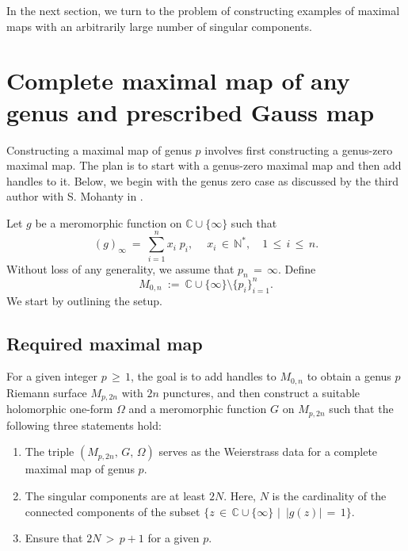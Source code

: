 \documentclass[12pt]{amsart}
\numberwithin{equation}{section}
\begin{document}
In the next section, we turn to the problem of constructing examples of maximal maps with an arbitrarily large 
number of singular components.

\section{Complete maximal map of any genus and prescribed Gauss map}\label{sec:Mainsec}

Constructing a maximal map of genus \(p\) involves first constructing a genus-zero maximal map. The 
plan is to start with a genus-zero maximal map and then add handles to it. Below, we begin with the genus zero 
case as discussed by the third author with S. Mohanty in \cite{SaiPradip0genus}.

Let \( g \) be a meromorphic function on \( \mathbb{C} \cup \{\infty\} \) such that
\begin{equation}\label{gaussmap1}
(g)_{\infty}\ =\ \sum_{i=1}^{n} x_i\; p_i,\ \quad x_i \,\in\, \mathbb{N}^*, \quad 1 \,\leq\, i \,\leq\, n.
\end{equation}
Without loss of any generality, we assume that \( p_n \,=\, \infty \). Define \[ M_{0,n} \ :=\ \mathbb{C} \cup
\{\infty\} \setminus \{p_i\}_{i=1}^n .\] We start by outlining the setup.

\subsection{Required maximal map}\label{required maximal map setup}

For a given integer \( p \,\geq\, 1 \), the goal is to add handles to \( M_{0,n} \) to obtain a
genus \( p \) Riemann surface \( M_{p,2n} \) with \(2n\) punctures, and then construct a suitable holomorphic
one-form \(\Omega\) and a meromorphic function \(G\) on \(M_{p,2n}\) such that the following three statements
hold:
\begin{enumerate} 
\item The triple \((M_{p, 2n},\, G, \,\Omega)\) serves as the Weierstrass data for a complete maximal map
of genus $p$.

\item The singular components are at least \(2N\). Here, \(N\) is the cardinality
of the connected components of the subset \(\{z\,\in\, \mathbb{C} \cup \{\infty\} \,\,\big\vert\,\,\,
 |g(z)| \,=\, 1\}\).

\item Ensure that \(2N \,>\, p+1\) for a given \(p\).
\end{enumerate}
\end{document}
